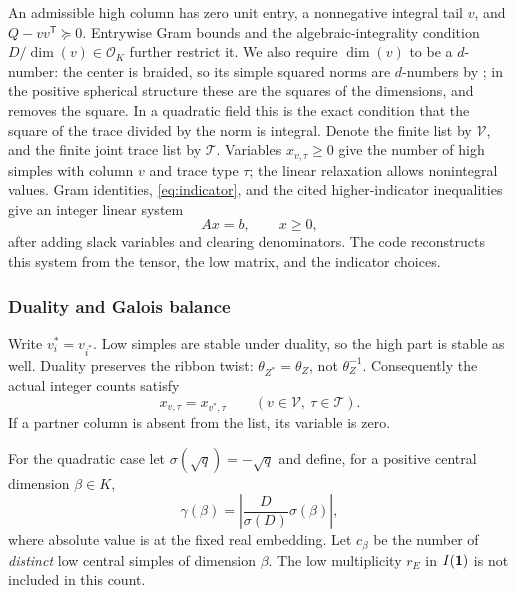 An admissible high column has zero unit entry, a nonnegative integral
tail $v$, and $Q-vv^{\mathsf T}\succeq0$. Entrywise Gram bounds and the
algebraic-integrality condition $D/\dim(v)\in\mathcal O_K$ further
restrict it. We also require $\dim(v)$ to be a $d$-number: the center
is braided, so its simple squared norms are $d$-numbers by
\cite[Theorem~1.8]{Ocode}; in the positive spherical structure these
are the squares of the dimensions, and
\cite[Corollary~2.9]{Ocode} removes the square. In a quadratic field
this is the exact condition that the square of the trace divided by
the norm is integral. Denote the finite list by $\mathcal V$, and the finite
joint trace list by $\mathcal T$. Variables $x_{v,\tau}\ge0$ give the
number of high simples with column $v$ and trace type $\tau$; the
linear relaxation allows nonintegral values. Gram identities,
\eqref{eq:indicator}, and the cited higher-indicator inequalities give
an integer linear system
\begin{equation}\label{eq:lp}
 Ax=b,\qquad x\ge0,
\end{equation}
after adding slack variables and clearing denominators. The code
reconstructs this system from the tensor, the low matrix, and the
indicator choices.

\subsubsection{Duality and Galois balance}
Write $v^*_i=v_{i^*}$. Low simples are stable under duality, so the high
part is stable as well. Duality preserves the ribbon twist:
$\theta_{Z^*}=\theta_Z$, not $\theta_Z^{-1}$. Consequently the
actual integer counts satisfy
\begin{equation}\label{eq:dualbalance}
 x_{v,\tau}=x_{v^*,\tau}
 \qquad(v\in\mathcal V,\ \tau\in\mathcal T).
\end{equation}
If a partner column is absent from the list, its variable is zero.

For the quadratic case let $\sigma(\sqrt q)=-\sqrt q$ and define, for
a positive central dimension $\beta\in K$,
\begin{equation}\label{eq:gammadim}
 \gamma(\beta)=\left|\frac{D}{\sigma(D)}\sigma(\beta)\right|,
\end{equation}
where absolute value is at the fixed real embedding. Let $c_\beta$ be
the number of \emph{distinct} low central simples of dimension $\beta$.
The low multiplicity $r_E$ in $I(\mathbf1)$ is not included in this count.

